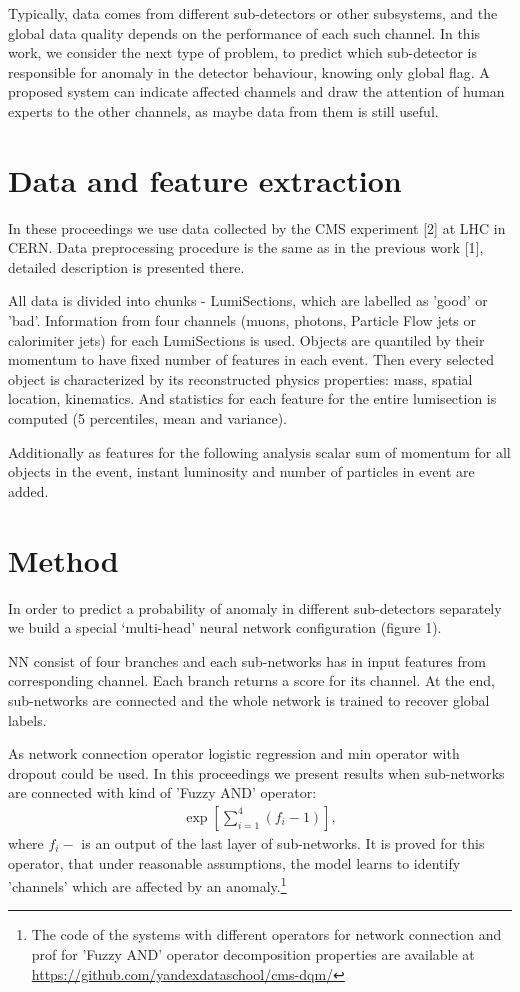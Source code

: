 \documentclass[a4paper]{jpconf}
\begin{document}
Typically, data comes from different sub-detectors or other subsystems, and the global data quality depends on the performance of each such channel. In this work, we consider the next type of problem, to predict which sub-detector is responsible for anomaly in the detector behaviour, knowing only global flag. A proposed system can indicate affected channels and draw the attention of human experts to the other channels, as maybe data from them is still useful.




\section{Data and feature extraction}
In these proceedings we use data collected by the CMS experiment [2] at LHC in CERN. Data preprocessing procedure is the same as in the previous work [1], detailed description is presented there. 

All data is divided into chunks - LumiSections, which are labelled as 'good' or 'bad'. Information from four channels (muons, photons, Particle Flow jets or calorimiter jets) for each LumiSections is used. Objects are quantiled by their momentum to have fixed number of features in each event. Then every selected object is characterized by its reconstructed physics properties: mass, spatial location, kinematics. And statistics for each feature for the entire lumisection is computed (5 percentiles, mean and variance).

Additionally as features for the following analysis
scalar sum of momentum for all objects in the event,
instant luminosity and number of particles in event are added.




\section{Method}
In order to predict a probability of anomaly in different sub-detectors separately 
we build a special ‘multi-head’ neural network configuration (figure 1). 

NN consist of four branches and each sub-networks has in input features from 
corresponding channel. Each branch returns a score for its channel. At the end, sub-networks are
connected and the whole network is trained to recover global labels.

As network connection operator logistic regression and min operator with dropout could be used. In this proceedings we present results when sub-networks are connected with kind of 'Fuzzy AND' operator: \begin{eqnarray}
\exp [\sum_{i=1}^4(f_{i} - 1)],
\end{eqnarray}
where $f_{i} - $ is an output of the last layer of sub-networks. It is proved for this operator, that under reasonable assumptions, the model learns to identify 'channels' which are affected by an anomaly.\footnote{The code of the systems with different operators for network connection and prof for 'Fuzzy AND' operator decomposition properties are available at \url{https://github.com/yandexdataschool/cms-dqm/} }
\end{document}
